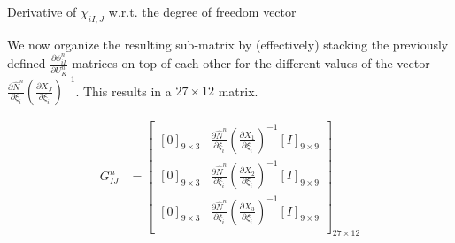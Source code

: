 \documentclass[11pt]{beamer}
\begin{document}
\begin{frame}{Derivative of $\chi_{iI,J}$ w.r.t. the degree of freedom vector}

We now organize the resulting sub-matrix by (effectively) stacking the previously defined $\frac{\partial \phi_{iI}^n}{\partial U_K^n}$ matrices on top of each other for the different values of the vector $\frac{\partial \hat{N}^n}{\partial \xi_{\hat{i}}}\left(\frac{\partial X_J}{\partial \xi_{\hat{i}}}\right)^{-1}$. This results in a $27 \times 12$ matrix.

\begin{align*}
G_{IJ}^n &= \left[\begin{array}{cc}
\left[0\right]_{9\times 3} & \frac{\partial \hat{N}^n}{\partial \xi_{\hat{i}}}\left(\frac{\partial X_1}{\partial \xi_{\hat{i}}}\right)^{-1} \left[I\right]_{9 \times 9}\\
\left[0\right]_{9\times 3} & \frac{\partial \hat{N}^n}{\partial \xi_{\hat{i}}}\left(\frac{\partial X_2}{\partial \xi_{\hat{i}}}\right)^{-1} \left[I\right]_{9 \times 9}\\
\left[0\right]_{9\times 3} & \frac{\partial \hat{N}^n}{\partial \xi_{\hat{i}}}\left(\frac{\partial X_3}{\partial \xi_{\hat{i}}}\right)^{-1} \left[I\right]_{9 \times 9}\\
\end{array}\right]_{27 \times 12}
\end{align*}

\end{frame}
%
%
%
%
\end{document}
